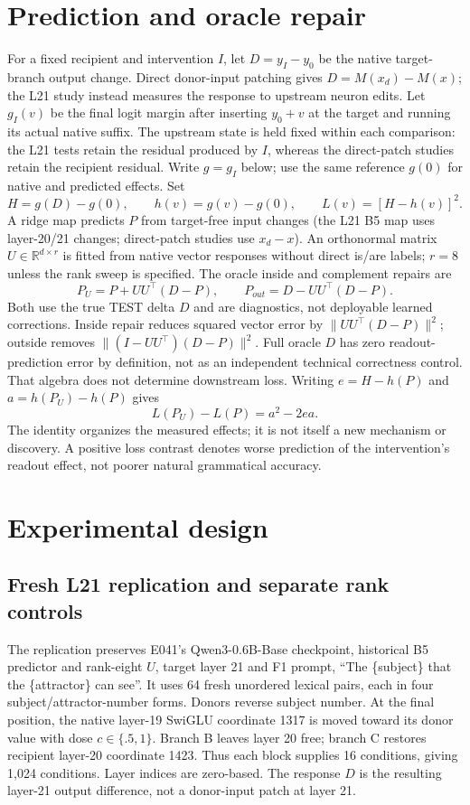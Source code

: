 \section{Prediction and oracle repair}
For a fixed recipient and intervention $I$, let $D=y_I-y_0$ be the native target-branch output change. Direct donor-input patching gives $D=M(x_d)-M(x)$; the L21 study instead measures the response to upstream neuron edits. Let $g_I(v)$ be the final logit margin after inserting $y_0+v$ at the target and running its actual native suffix. The upstream state is held fixed within each comparison: the L21 tests retain the residual produced by $I$, whereas the direct-patch studies retain the recipient residual. Write $g=g_I$ below; use the same reference $g(0)$ for native and predicted effects. Set
\[
 H=g(D)-g(0),\qquad h(v)=g(v)-g(0),\qquad L(v)=[H-h(v)]^2.
\]
A ridge map predicts $P$ from target-free input changes (the L21 B5 map uses layer-20/21 changes; direct-patch studies use $x_d-x$). An orthonormal matrix $U\in\mathbb R^{d\times r}$ is fitted from native vector responses without direct is/are labels; $r=8$ unless the rank sweep is specified. The oracle inside and complement repairs are
\[
 P_U=P+UU^\top(D-P),\qquad P_{out}=D-UU^\top(D-P).
\]
Both use the true TEST delta $D$ and are diagnostics, not deployable learned corrections. Inside repair reduces squared vector error by $\|UU^\top(D-P)\|^2$; outside removes $\|(I-UU^\top)(D-P)\|^2$. Full oracle $D$ has zero readout-prediction error by definition, not as an independent technical correctness control. That algebra does not determine downstream loss. Writing $e=H-h(P)$ and $a=h(P_U)-h(P)$ gives
\[
 L(P_U)-L(P)=a^2-2ea.
\]
The identity organizes the measured effects; it is not itself a new mechanism or discovery. A positive loss contrast denotes worse prediction of the intervention's readout effect, not poorer natural grammatical accuracy.

\section{Experimental design}
\subsection{Fresh L21 replication and separate rank controls}\label{sec:l21design}
The replication preserves E041's Qwen3-0.6B-Base checkpoint, historical B5 predictor and rank-eight $U$, target layer 21 and F1 prompt, ``The \{subject\} that the \{attractor\} can see''. It uses 64 fresh unordered lexical pairs, each in four subject/attractor-number forms. Donors reverse subject number. At the final position, the native layer-19 SwiGLU coordinate 1317 is moved toward its donor value with dose $c\in\{.5,1\}$. Branch B leaves layer 20 free; branch C restores recipient layer-20 coordinate 1423. Thus each block supplies 16 conditions, giving 1,024 conditions. Layer indices are zero-based. The response $D$ is the resulting layer-21 output difference, not a donor-input patch at layer 21.

